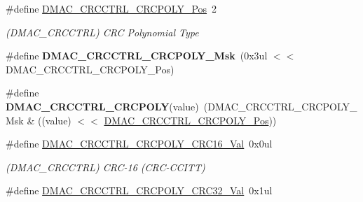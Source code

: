 \begin{DoxyCompactItemize}
\item 
\hypertarget{group___s_a_m_l21___d_m_a_c_ga97c64ee6ae79fa28bef8e734380d31ee}{}\#define \hyperlink{group___s_a_m_l21___d_m_a_c_ga97c64ee6ae79fa28bef8e734380d31ee}{D\+M\+A\+C\+\_\+\+C\+R\+C\+C\+T\+R\+L\+\_\+\+C\+R\+C\+P\+O\+L\+Y\+\_\+\+Pos}~2\label{group___s_a_m_l21___d_m_a_c_ga97c64ee6ae79fa28bef8e734380d31ee}

\begin{DoxyCompactList}\small\item\em (D\+M\+A\+C\+\_\+\+C\+R\+C\+C\+T\+R\+L) C\+R\+C Polynomial Type \end{DoxyCompactList}\item 
\hypertarget{group___s_a_m_l21___d_m_a_c_ga84436ebbc2a170f10d45b5f245e624a1}{}\#define {\bfseries D\+M\+A\+C\+\_\+\+C\+R\+C\+C\+T\+R\+L\+\_\+\+C\+R\+C\+P\+O\+L\+Y\+\_\+\+Msk}~(0x3ul $<$$<$ D\+M\+A\+C\+\_\+\+C\+R\+C\+C\+T\+R\+L\+\_\+\+C\+R\+C\+P\+O\+L\+Y\+\_\+\+Pos)\label{group___s_a_m_l21___d_m_a_c_ga84436ebbc2a170f10d45b5f245e624a1}

\item 
\hypertarget{group___s_a_m_l21___d_m_a_c_gacb1e33065828144f490ca038f9a2b87f}{}\#define {\bfseries D\+M\+A\+C\+\_\+\+C\+R\+C\+C\+T\+R\+L\+\_\+\+C\+R\+C\+P\+O\+L\+Y}(value)~(D\+M\+A\+C\+\_\+\+C\+R\+C\+C\+T\+R\+L\+\_\+\+C\+R\+C\+P\+O\+L\+Y\+\_\+\+Msk \& ((value) $<$$<$ \hyperlink{group___s_a_m_l21___d_m_a_c_ga97c64ee6ae79fa28bef8e734380d31ee}{D\+M\+A\+C\+\_\+\+C\+R\+C\+C\+T\+R\+L\+\_\+\+C\+R\+C\+P\+O\+L\+Y\+\_\+\+Pos}))\label{group___s_a_m_l21___d_m_a_c_gacb1e33065828144f490ca038f9a2b87f}

\item 
\hypertarget{group___s_a_m_l21___d_m_a_c_gab7a571f0737b3094278178b68b70b75f}{}\#define \hyperlink{group___s_a_m_l21___d_m_a_c_gab7a571f0737b3094278178b68b70b75f}{D\+M\+A\+C\+\_\+\+C\+R\+C\+C\+T\+R\+L\+\_\+\+C\+R\+C\+P\+O\+L\+Y\+\_\+\+C\+R\+C16\+\_\+\+Val}~0x0ul\label{group___s_a_m_l21___d_m_a_c_gab7a571f0737b3094278178b68b70b75f}

\begin{DoxyCompactList}\small\item\em (D\+M\+A\+C\+\_\+\+C\+R\+C\+C\+T\+R\+L) C\+R\+C-\/16 (C\+R\+C-\/\+C\+C\+I\+T\+T) \end{DoxyCompactList}\item 
\hypertarget{group___s_a_m_l21___d_m_a_c_ga227b0d7a03589588e6f3234fba814b5a}{}\#define \hyperlink{group___s_a_m_l21___d_m_a_c_ga227b0d7a03589588e6f3234fba814b5a}{D\+M\+A\+C\+\_\+\+C\+R\+C\+C\+T\+R\+L\+\_\+\+C\+R\+C\+P\+O\+L\+Y\+\_\+\+C\+R\+C32\+\_\+\+Val}~0x1ul\label{group___s_a_m_l21___d_m_a_c_ga227b0d7a03589588e6f3234fba814b5a}


\end{DoxyCompactItemize}
